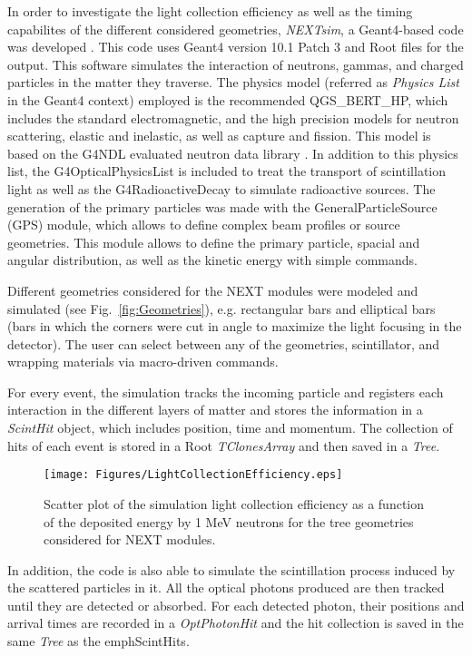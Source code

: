 In order to investigate the light collection efficiency as well as the timing capabilites of the different considered geometries, \emph{NEXTsim}, a {\sc Geant4}-based code was developed \cite{AGOSTINELLI2003250,ALLISON2016186}. This code uses  {\sc Geant4} version 10.1 Patch 3 and {\sc Root} files for the output.
This software simulates the interaction of neutrons, gammas, and charged particles in the matter they traverse. The  physics model (referred as \emph{Physics List} in the {\sc Geant4} context) employed is the recommended QGS\_BERT\_HP, which includes the standard electromagnetic, and the high precision models for neutron scattering, elastic and inelastic, as well as capture and fission.  This model is based on the G4NDL evaluated neutron data library \cite{Apostolakis2009}. In addition to this physics list, the G4OpticalPhysicsList is included to treat the transport of scintillation light as well as the G4RadioactiveDecay to simulate radioactive sources. The generation of the primary particles  was made with the GeneralParticleSource (GPS) module, which allows to define complex beam profiles or source geometries. This module allows to define the primary particle,  spacial and angular distribution, as well as the kinetic energy with simple commands.
 
 Different geometries considered for the NEXT modules were modeled and simulated (see  Fig.~\ref{fig:Geometries}), e.g. rectangular bars and elliptical bars (bars in which the corners were cut in angle to maximize the light focusing in the detector). The user can select between any of the geometries, scintillator, and wrapping materials via macro-driven commands.

For every event, the simulation tracks the incoming particle and registers each interaction in the different layers of matter and stores the information in a \emph{ScintHit} object, which includes position, time and momentum. The collection of hits of each event is stored in a  {\sc Root} \emph{TClonesArray} and then saved in a \emph{Tree}.

\begin{figure}[bt]
\centering
\texttt{[image: Figures/LightCollectionEfficiency.eps]}
\caption{Scatter plot of the simulation  light collection efficiency as a function of the deposited energy by 1 MeV neutrons for the tree geometries considered for NEXT modules.}
\label{fig:Efficiency}
\end{figure}

In addition, the code is also able to simulate the scintillation process induced by the scattered particles in it. All the optical photons produced are then tracked until they are detected or absorbed. For each detected photon, their positions and arrival times are recorded in  a \emph{OptPhotonHit} and the hit collection is saved in the same  \emph{Tree} as the emph{ScintHits}.

